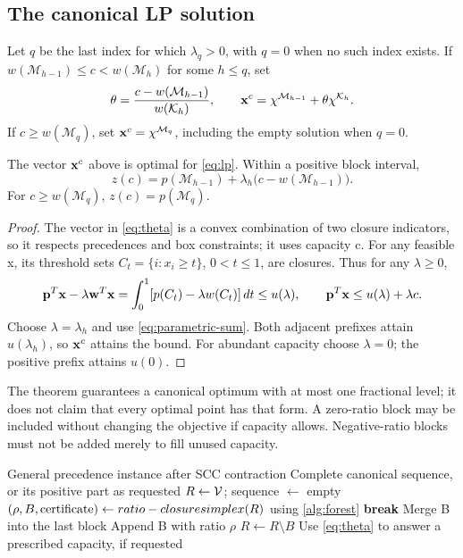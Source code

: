 \subsection{The canonical LP solution}
Let $q$ be the last index for which $\lambda_q>0$, with $q=0$ when no such
index exists. If
$w(\mathcal M_{h-1})\le c<w(\mathcal M_h)$ for some $h\le q$, set
\begin{equation}\label{eq:theta}
 \theta=\frac{c-w(\mathcal M_{h-1})}{w(\mathcal K_h)},\qquad
 \mathbf{x}^c=\chi^{\mathcal M_{h-1}}+\theta\chi^{\mathcal K_h}.
\end{equation}
If $c\ge w(\mathcal M_q)$, set $\mathbf{x}^c=\chi^{\mathcal M_q}$, including the
empty solution when $q=0$.

\begin{theorem}\label{thm:outer}
The vector $\mathbf{x}^c$ above is optimal for \eqref{eq:lp}. Within a positive
block interval,
\begin{equation}\label{eq:value}
 z(c)=p(\mathcal M_{h-1})+
              \lambda_h\bigl(c-w(\mathcal M_{h-1})\bigr).
\end{equation}
For $c\ge w(\mathcal M_q)$, $z(c)=p(\mathcal M_q)$.
\end{theorem}
\begin{proof}
The vector in \eqref{eq:theta} is a convex combination of two closure
indicators, so it respects precedences and box constraints; it uses capacity
c. For any feasible x, its threshold sets $C_t=\{i:x_i\ge t\}$,
$0<t\le1$, are closures. Thus for any $\lambda\ge0$,
\[
 \mathbf{p}^T\mathbf{x}-\lambda \mathbf{w}^T\mathbf{x}
   =\int_0^1[p(C_t)-\lambda w(C_t)]\,dt\le u(\lambda),
 \qquad \mathbf{p}^T\mathbf{x}\le u(\lambda)+\lambda c.
\]
Choose $\lambda=\lambda_h$ and use \eqref{eq:parametric-sum}. Both adjacent
prefixes attain $u(\lambda_h)$, so $\mathbf{x}^c$ attains the bound. For abundant
capacity choose $\lambda=0$; the positive prefix attains $u(0)$.
\end{proof}

The theorem guarantees a canonical optimum with at most one fractional
level; it does not claim that every optimal point has that form. A zero-ratio
block may be included without changing the objective if capacity allows.
Negative-ratio blocks must not be added merely to fill unused capacity.

\begin{algorithm}[htbp]
\caption{Block extraction using only \FS{} oracles}
\label{alg:outer}
\begin{algorithmic}[1]
\Require General precedence instance after SCC contraction
\Ensure Complete canonical sequence, or its positive part as requested
\State $R\gets\mathcal V$; sequence $\gets$ empty
  \State $(\rho,B,\text{certificate})\gets ratio-closure simplex(R)$ using \cref{alg:forest}
    \State \textbf{break}
  \EndIf
    \State Merge B into the last block
  \Else
    \State Append B with ratio $\rho$
  \EndIf
  \State $R\gets R\setminus B$
\EndWhile
\State Use \eqref{eq:theta} to answer a prescribed capacity, if requested
\end{algorithmic}
\end{algorithm}

